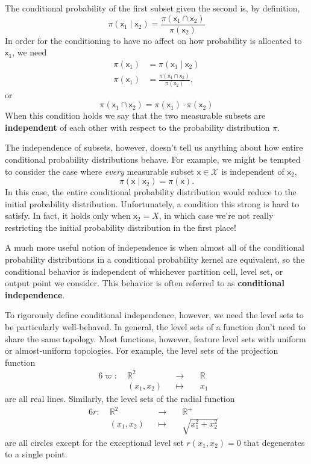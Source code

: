 \documentclass[
  letterpaper,
  DIV=11,
  numbers=noendperiod]{scrartcl}
\begin{document}
The conditional probability of the first subset given the second is, by
definition, \[
\pi( \mathsf{x}_{1} \mid \mathsf{x}_{2} )
=
\frac{ \pi( \mathsf{x}_{1} \cap \mathsf{x}_{2} ) }
{ \pi( \mathsf{x}_{2} ) }
\] In order for the conditioning to have no affect on how probability is
allocated to \(\mathsf{x}_{1}\), we need \begin{align*}
\pi( \mathsf{x}_{1} )
&=
\pi( \mathsf{x}_{1} \mid \mathsf{x}_{2} )
\\
\pi( \mathsf{x}_{1} )
&=
\frac{ \pi( \mathsf{x}_{1} \cap \mathsf{x}_{2} ) }
{ \pi( \mathsf{x}_{2} ) },
\end{align*} or \[
\pi( \mathsf{x}_{1} \cap \mathsf{x}_{2} )
=
\pi( \mathsf{x}_{1} ) \cdot \pi( \mathsf{x}_{2} )
\] When this condition holds we say that the two measurable subsets are
\textbf{independent} of each other with respect to the probability
distribution \(\pi\).

The independence of subsets, however, doesn't tell us anything about how
entire conditional probability distributions behave. For example, we
might be tempted to consider the case where \emph{every} measurable
subset \(\mathsf{x} \in \mathcal{X}\) is independent of
\(\mathsf{x}_{2}\), \[
\pi ( \mathsf{x} \mid \mathsf{x}_{2} ) = \pi( \mathsf{x} ).
\] In this case, the entire conditional probability distribution would
reduce to the initial probability distribution. Unfortunately, a
condition this strong is hard to satisfy. In fact, it holds only when
\(\mathsf{x}_{2} = X\), in which case we're not really restricting the
initial probability distribution in the first place!

A much more useful notion of independence is when almost all of the
conditional probability distributions in a conditional probability
kernel are equivalent, so the conditional behavior is independent of
whichever partition cell, level set, or output point we consider. This
behavior is often referred to as \textbf{conditional independence}.

To rigorously define conditional independence, however, we need the
level sets to be particularly well-behaved. In general, the level sets
of a function don't need to share the same topology. Most functions,
however, feature level sets with uniform or almost-uniform topologies.
For example, the level sets of the projection function
\begin{alignat*}{6}
\varpi :\; &\mathbb{R}^{2}& &\rightarrow& \; &\mathbb{R}&
\\
&(x_{1}, x_{2})& &\mapsto& &x_{1}&
\end{alignat*} are all real lines. Similarly, the level sets of the
radial function \begin{alignat*}{6}
r :\; &\mathbb{R}^{2}& &\rightarrow& \; &\mathbb{R}^{+}&
\\
&(x_{1}, x_{2})& &\mapsto& &\sqrt{ x_{1}^{2} + x_{2}^{2} }&
\end{alignat*} are all circles except for the exceptional level set
\(r(x_{1}, x_{2}) = 0\) that degenerates to a single point.
\end{document}
